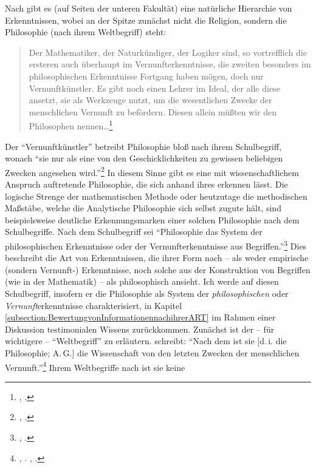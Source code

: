 Nach  gibt es (auf Seiten der unteren Fakultät) eine
natürliche Hierarchie von Erkenntnissen, wobei an der Spitze zunächst nicht die
Religion, sondern die Philosophie (nach ihrem Weltbegriff) steht:
\begin{quote}
  Der Mathematiker, der Naturkündiger, der Logiker sind, so vortrefflich die
  ersteren auch überhaupt im Vernunfterkenntnisse, die zweiten besonders im
  philosophischen Erkenntnisse Fortgang haben mögen, doch nur Vernunftkünstler. Es
  gibt noch einen Lehrer im Ideal, der alle diese ansetzt, sie als Werkzeuge
  nutzt, um die wesentlichen Zwecke der menschlichen Vernunft zu befördern. Diesen
  allein müßten wir den Philosophen
  nennen\dots\footnote{\cite[][B~867]{Kant:KritikderreinenVernunft2003}, \cite[][III:
  542.33--543.2]{Kant:GesammelteWerke1900ff.}.}
\end{quote}
Der \enquote{Vernunftkünstler} betreibt Philosophie bloß nach ihrem
Schulbegriff, wonach \enquote{sie nur als eine von den Geschicklichkeiten zu
gewissen beliebigen Zwecken angesehen
wird.}\footnote{\cite[B~867]{Kant:KritikderreinenVernunft2003},
\cite[III: 543.33--34]{Kant:GesammelteWerke1900ff.}.} In diesem Sinne gibt es
eine mit wissenschaftlichem Anspruch auftretende Philosophie, die sich anhand ihres
 erkennen lässt. Die logische Strenge der
mathematischen Methode oder heutzutage die methodischen Maßstäbe, welche die Analytische
Philosophie sich selbst zugute hält, sind beispielsweise deutliche Erkennungsmarken einer
solchen Philosophie nach dem Schulbegriffe. Nach dem Schulbegriff sei
\enquote{Philosophie {\punkt} das System der philosophischen Erkenntnisse oder
der Vernunfterkenntnisse aus Begriffen.}\footnote{\cite[][A
23]{Kant:ImmanuelKantsLogik1977}, \cite[][IX:
23.30--31]{Kant:GesammelteWerke1900ff.}.} Dies beschreibt die Art von
Erkenntnissen, die  ihrer Form nach -- als weder empirische
(sondern Vernunft-) Erkenntnisse, noch solche aus der Konstruktion von Begriffen
(wie in der Mathematik) --  als philosophisch ansieht. Ich werde auf diesen
Schulbegriff, insofern er die Philosophie als System der \emph{philosophischen}
oder \emph{Vernunft}erkenntnisse charakterisiert, in Kapitel
\ref{subsection:BewertungvonInformationennachihrerART} im Rahmen einer
Diskussion testimonialen Wissens zurückkommen. Zunächst ist der -- für
 wichtigere -- \enquote{Weltbegriff} zu erläutern.
 schreibt: \enquote{Nach dem  ist
sie [d.\,i. die Philosophie; A.\,G.] die Wissenschaft von den letzten Zwecken
der menschlichen Vernunft.}\footnote{\cite[][A~23]{Kant:ImmanuelKantsLogik1977}, \cite[][IX:
23.32--33]{Kant:GesammelteWerke1900ff.}. \cite[Siehe
auch][B~866]{Kant:KritikderreinenVernunft2003}, \cite[III:
542.3--24]{Kant:GesammelteWerke1900ff.}.} Ihrem Weltbegriffe nach ist sie keine
